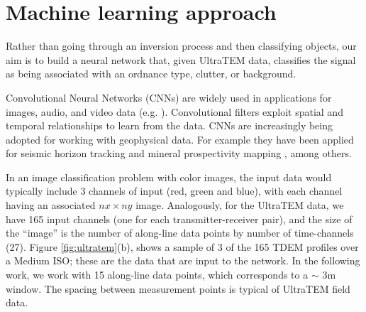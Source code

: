 \documentclass{segabs}
\begin{document}
\section{Machine learning approach}

Rather than going through an inversion process and then classifying objects, our aim is to build a neural network that, given UltraTEM data, classifies the signal as being associated with an ordnance type, clutter, or background.

Convolutional Neural Networks (CNNs) are widely used in applications for images, audio, and video data (e.g. \cite{Krizhevsky2012, LeCun1995, LeCun2010}). Convolutional filters exploit spatial and temporal relationships to learn from the data. CNNs are increasingly being adopted for working with geophysical data. For example they have been applied for seismic horizon tracking \citep{Peters2020} and mineral prospectivity mapping \citep{Granek2016}, among others.

In an image classification problem with color images, the input data would typically include 3 channels of input (red, green and blue), with each channel having an associated $nx \times ny$ image. Analogously, for the UltraTEM data, we have 165 input channels (one for each transmitter-receiver pair), and the size of the ``image'' is the number of along-line data points by number of time-channels (27). Figure \ref{fig:ultratem}(b), shows a sample of 3 of the 165 TDEM profiles over a Medium ISO; these are the data that are input to the network. In the following work, we work with 15 along-line data points, which corresponds to a $\sim$ 3m window. The spacing between measurement points is typical of UltraTEM field data.
\end{document}
